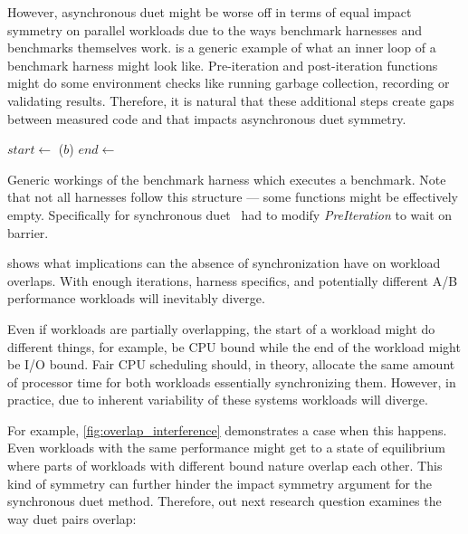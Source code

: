 However, asynchronous duet might be worse off in terms of equal impact symmetry on parallel workloads due to the ways benchmark harnesses and benchmarks themselves work.
 is a generic example of what an inner loop of a benchmark harness might look like.
Pre-iteration and post-iteration functions might do some environment checks like running garbage collection, recording or validating results.
Therefore, it is natural that these additional steps create gaps between measured code and that impacts asynchronous duet symmetry.

\begin{algorithm}
\begin{algorithmic}
		\State {}
		 	\State {}
			\State $start \gets$ 
			\State {}($b$)
			\State $end \gets$ 
			\State {}
		\EndFor
		\State {}
		\State {}
	\EndFunction
\end{algorithmic}
\caption{
	Generic workings of the benchmark harness which executes a benchmark.
	Note that not all harnesses follow this structure --- some functions might be effectively empty.
	Specifically for synchronous duet~\citet{bulej2020duet} had to modify \emph{PreIteration} to wait on barrier.
}
\label{alg:harness}
\end{algorithm}

 shows what implications can the absence of synchronization have on workload overlaps.
With enough iterations, harness specifics, and potentially different A/B performance workloads will inevitably diverge.

Even if workloads are partially overlapping, the start of a workload might do different things, for example, be CPU bound while the end of the workload might be I/O bound.
Fair CPU scheduling should, in theory, allocate the same amount of processor time for both workloads essentially synchronizing them.
However, in practice, due to inherent variability of these systems workloads will diverge.

For example, \cref{fig:overlap_interference} demonstrates a case when this happens.
Even workloads with the same performance might get to a state of equilibrium where parts of workloads with different bound nature overlap each other.
This kind of symmetry can further hinder the impact symmetry argument for the synchronous duet method.
Therefore, out next research question examines the way duet pairs overlap:

